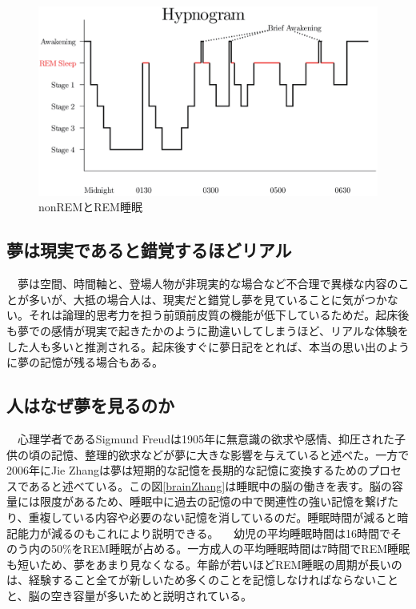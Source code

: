 \begin{figure}[htbp]
\begin{center}
\includegraphics[width=15cm]{eps/SleepHypnogram.eps}
\caption{nonREMとREM睡眠}
\label{SleepHypnogram}
\end{center}
\end{figure}

\subsection{夢は現実であると錯覚するほどリアル}
　夢は空間、時間軸と、登場人物が非現実的な場合など不合理で異様な内容のことが多いが、大抵の場合人は、現実だと錯覚し夢を見ていることに気がつかない。それは論理的思考力を担う前頭前皮質の機能が低下しているためだ\cite{cortex}。起床後も夢での感情が現実で起きたかのように勘違いしてしまうほど、リアルな体験をした人も多いと推測される。起床後すぐに夢日記をとれば、本当の思い出のように夢の記憶が残る場合もある。

\subsection{人はなぜ夢を見るのか}
　心理学者であるSigmund Freudは1905年に無意識の欲求や感情、抑圧された子供の頃の記憶、整理的欲求などが夢に大きな影響を与えていると述べた\cite{freud}。一方で2006年にJie Zhangは夢は短期的な記憶を長期的な記憶に変換するためのプロセスであると述べている。この図\ref{brainZhang}は睡眠中の脳の働きを表す。脳の容量には限度があるため、睡眠中に過去の記憶の中で関連性の強い記憶を繋げたり、重複している内容や必要のない記憶を消しているのだ\cite{Zhang}。睡眠時間が減ると暗記能力が減るのもこれにより説明できる。
　幼児の平均睡眠時間は16時間でそのう内の50\%をREM睡眠が占める。一方成人の平均睡眠時間は7時間でREM睡眠も短いため、夢をあまり見なくなる。年齢が若いほどREM睡眠の周期が長いのは、経験すること全てが新しいため多くのことを記憶しなければならないことと、脳の空き容量が多いためと説明されている。

